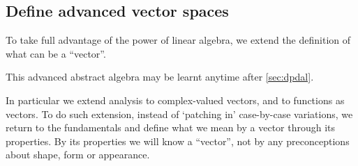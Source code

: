 \begin{draft}
\section{Define advanced vector spaces}
\label{sec:davsof}

\secttoc

\begin{comment}
axiomatic approach.  Rebuild the foundations.
Maybe \pooliv{Ch.6 and~7} \larsvii{Ch.5 and~8} \holti{Ch.10, \S11.4--5}
\end{comment}

To take full advantage of the power of linear algebra, we extend the definition of what can be a ``vector''.
\begin{aside}
This advanced abstract algebra may be learnt anytime after \autoref{sec:dpdal}.
\end{aside}
In particular we extend analysis to complex-valued vectors, and to functions as vectors.
To do such extension, instead of `patching in' case-by-case variations, we return to the fundamentals and define what we mean by a vector through its properties.
By its properties we will know a ``vector'', not by any preconceptions about shape, form or appearance.



\end{draft}
